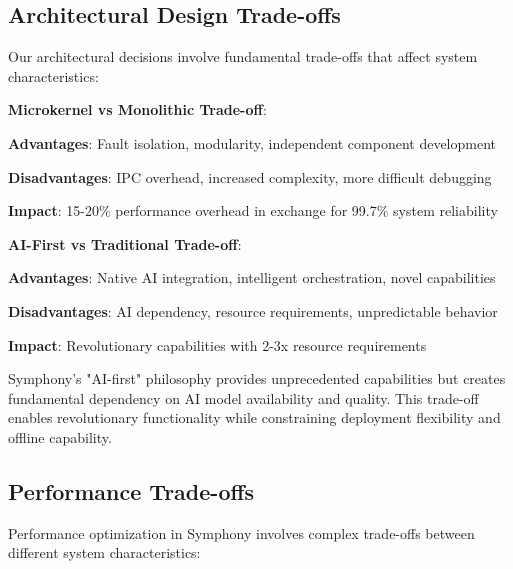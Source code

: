 \subsection*{Architectural Design Trade-offs}

Our architectural decisions involve fundamental trade-offs that affect system characteristics:

\textbf{Microkernel vs Monolithic Trade-off}:
\begin{compactlist}
    \item \textbf{Advantages}: Fault isolation, modularity, independent component development
    \item \textbf{Disadvantages}: IPC overhead, increased complexity, more difficult debugging
    \item \textbf{Impact}: 15-20\% performance overhead in exchange for 99.7\% system reliability
\end{compactlist}

\textbf{AI-First vs Traditional Trade-off}:
\begin{compactlist}
    \item \textbf{Advantages}: Native AI integration, intelligent orchestration, novel capabilities
    \item \textbf{Disadvantages}: AI dependency, resource requirements, unpredictable behavior
    \item \textbf{Impact}: Revolutionary capabilities with 2-3x resource requirements
\end{compactlist}

\begin{infobox}[title=Design Philosophy Trade-off]
Symphony's "AI-first" philosophy provides unprecedented capabilities but creates fundamental dependency on AI model availability and quality. This trade-off enables revolutionary functionality while constraining deployment flexibility and offline capability.
\end{infobox}

\subsection*{Performance Trade-offs}

Performance optimization in Symphony involves complex trade-offs between different system characteristics:

